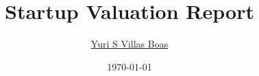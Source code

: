 
\title{Startup Valuation Report}
\author{\href{https://linktr.ee/yurisvb}{Yuri S Villas Boas}}
\date{\today}


\newcommand{\companyname}{T3 Information Security}
\newcommand{\documenttype}{Executive Summary}
\newcommand{\documentstatus}{Draft}


